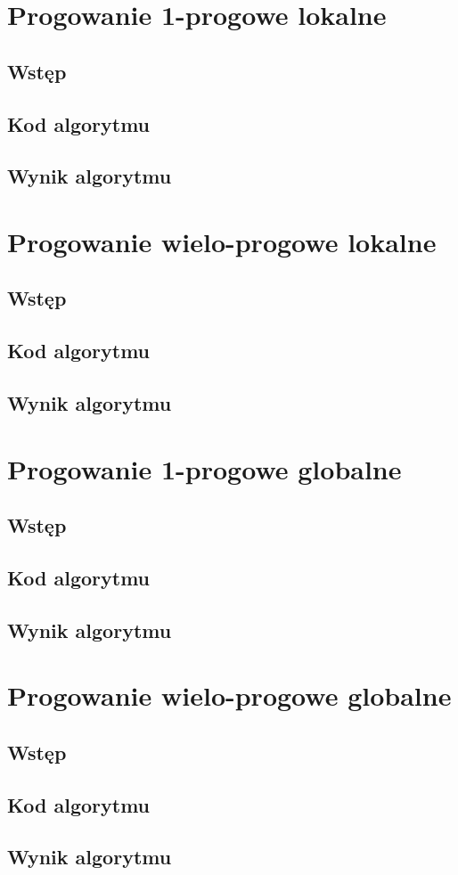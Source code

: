 \documentclass[a4paper,12pt]{book}
\begin{document}
\section{Progowanie 1-progowe lokalne}
\subsection*{Wstęp}
\subsection*{Kod algorytmu}
\subsection*{Wynik algorytmu}

\section{Progowanie wielo-progowe lokalne}
\subsection*{Wstęp}
\subsection*{Kod algorytmu}
\subsection*{Wynik algorytmu}

\section{Progowanie 1-progowe globalne}
\subsection*{Wstęp}
\subsection*{Kod algorytmu}
\subsection*{Wynik algorytmu}

\section{Progowanie wielo-progowe globalne}
\subsection*{Wstęp}
\subsection*{Kod algorytmu}
\subsection*{Wynik algorytmu}
\end{document}
